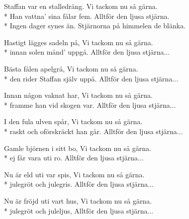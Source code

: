 \begin{SongText}[Staffansvisan]
    \begin{SongVerse}
        Staffan var en stalledräng. Vi tackom nu så gärna.\\*%
        Han vattna' sina fålar fem. Alltför den ljusa stjärna.\\*%
        Ingen dager synes än. Stjärnorna på himmelen de blänka.
    \end{SongVerse}
    \begin{SongVerse}
        Hastigt lägges sadeln på, Vi tackom nu så gärna.\\*%
        innan solen månd' uppgå. Alltför den ljusa stjärna...
    \end{SongVerse}
    \begin{SongVerse}
        Bästa fålen apelgrå, Vi tackom nu så gärna.\\*%
        den rider Staffan själv uppå. Alltför den ljusa stjärna...
    \end{SongVerse}
    \begin{SongVerse}
        Innan någon vaknat har, Vi tackom nu så gärna.\\*%
        framme han vid skogen var. Alltför den ljusa stjärna...
    \end{SongVerse}
    \begin{SongVerse}
        I den fula ulven spår, Vi tackom nu så gärna.\\*%
        raskt och oförskräckt han går. Alltför den ljusa stjärna...
    \end{SongVerse}
    \begin{SongVerse}
        Gamle björnen i sitt bo, Vi tackom nu så gärna.\\*%
        ej får vara uti ro. Alltför den ljusa stjärna...
    \end{SongVerse}
    \begin{SongVerse}
        Nu är eld uti var spis, Vi tackom nu så gärna.\\*%
        julegröt och julegris. Alltför den ljusa stjärna...
    \end{SongVerse}
    \begin{SongVerse}
        Nu är fröjd uti vart hus, Vi tackom nu så gärna.\\*%
        julegröt och juleljus, Alltför den ljusa stjärna...
    \end{SongVerse}
    \begin{SongVerse}
    \end{SongVerse}
\end{SongText}